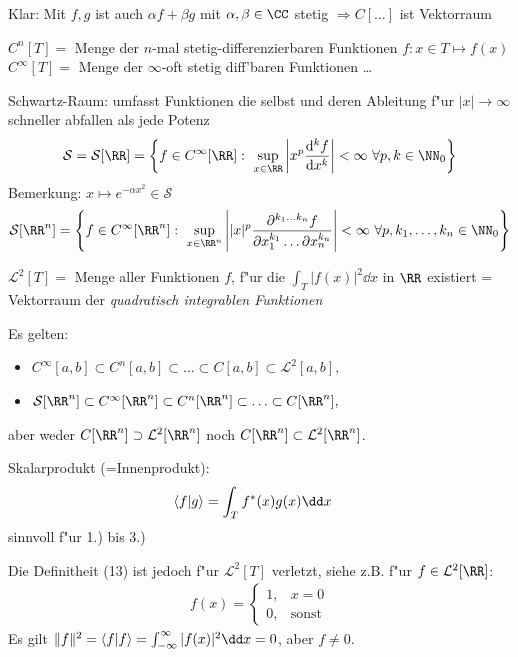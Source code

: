 \documentclass[a4paper]{scrartcl}
\begin{document}
{\begin{1aufz}
Klar: Mit $f,g$ ist auch $\alpha f + \beta g$ mit $\alpha, \beta \in \CC$ stetig $\Longrightarrow C[\ldots]$ ist Vektorraum

\item $C^n[T] = $ Menge der $n$-mal stetig-differenzierbaren Funktionen $f: x \in T \mapsto f(x)$ \\
$C^\infty[T] = $ Menge der $\infty$-oft stetig diff'baren Funktionen \ldots
\item Schwartz-Raum: umfasst Funktionen die selbst und deren Ableitung f"ur $\vert x \vert \rightarrow \infty$ schneller abfallen als jede Potenz
$$\mathcal S = \mathcal S [\RR] = \left\{ f \in C^\infty[\RR]: \ \sup_{x \in \RR} \left\vert x^p \frac{\mathrm{d}^kf}{\mathrm d x^k } \right\vert < \infty \ \forall p,k \in \NN_0 \right\} $$
Bemerkung: $x \mapsto e^{-\alpha x^2} \in \mathcal S$
$$\mathcal S [\RR^n] = \left\{ f \in C^\infty[\RR^n]: \ \sup_{x \in \RR^n} \left\vert \vert x \vert^p \frac{\partial^{k_1 \ldots k_n}f}{\partial x_1^{k_1} \ldots \partial x_n^{k_n} } \right\vert < \infty \ \forall p,k_1, \ldots, k_n \in \NN_0 \right\} $$
\item $\mathcal L^2[T] = $ Menge aller Funktionen $f$, f"ur die $\int_T \vert f(x) \vert^2 \dd x$ in $\RR$ existiert  = Vektorraum der \emph{quadratisch integrablen Funktionen}
\end{1aufz}
Es gelten:
\begin{itemize}
\item $C^\infty[a,b] \subset C^n[a,b] \subset \ldots \subset C[a,b] \subset \mathcal L^2[a,b],$
\item $\mathcal S[\RR^n] \subset C^\infty[\RR^n] \subset  C^n[\RR^n] \subset \ldots \subset C[\RR^n],$
\end{itemize}
aber weder $C[\RR^n] \supset \mathcal L^2[\RR^n]$ noch $C[\RR^n] \subset \mathcal L^2[\RR^n]$.

Skalarprodukt (=Innenprodukt):
\begin{align}
\braket{ f | g} & = \int_T f^*(x) g(x) \dd x
\end{align}
sinnvoll f"ur 1.) bis 3.)

Die Definitheit (13) ist jedoch f"ur $\mathcal L^2[T]$ verletzt, siehe z.B. f"ur $f \in \mathcal L^2[\RR]$:
\begin{align}
f(x) = \begin{cases} 1, & x=0 \\ 0, & \mathrm{sonst} \end{cases}
\end{align}
Es gilt $\Vert f \Vert^2 = \braket{ f | f} = \int_{-\infty}^\infty \vert f(x) \vert^2 \dd x = 0$, aber $f \neq 0$.

}
\end{document}
